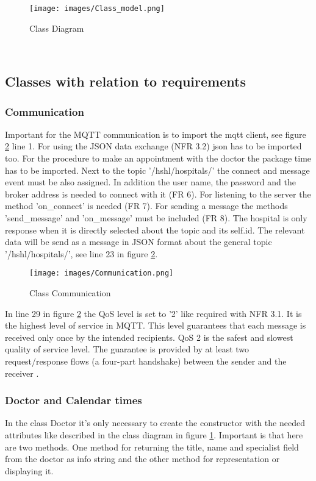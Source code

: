 \begin{figure}[H]
\centering
\sidecaption
\texttt{[image: images/Class\_model.png]}
\caption{Class Diagram}
\label{Class_diagram}
\end{figure}

\\
\subsection{Classes with relation to requirements}
\subsubsection{Communication}
Important for the MQTT communication is to import the mqtt client, see figure \ref{Communication} line 1. For using the JSON data exchange (NFR 3.2) json has to be imported too. For the procedure to make an appointment with the doctor the package time has to be imported. Next to the topic '/hshl/hospitals/' the connect and message event must be also assigned. In addition the user name, the password and the broker address is needed to connect with it (FR 6). For listening to the server the method 'on_connect' is needed (FR 7). For sending a message the methods 'send_message' and 'on_message' must be included (FR 8). The hospital is only response when it is directly selected about the topic and its self.id. The relevant data will be send as a message in JSON format about the general topic '/hshl/hospitals/', see line 23 in figure \ref{Communication}.

\begin{figure}[H]
\centering
\sidecaption
\texttt{[image: images/Communication.png]}
\caption{Class Communication}
\label{Communication}
\end{figure}

In line 29 in figure \ref{Communication} the QoS level is set to '2' like required with NFR 3.1. It is the highest level of service in MQTT. This level guarantees that each message is received only once by the intended recipients. QoS 2 is the safest and slowest quality of service level. The guarantee is provided by at least two request/response flows (a four-part handshake) between the sender and the receiver \cite{ferguson1998quality}.

\subsubsection{Doctor and Calendar times}
In the class Doctor it's only necessary to create the constructor with the needed attributes like described in the class diagram in figure \ref{Class_diagram}. Important is that here are two methods. One method for returning the title, name and specialist field from the doctor as info string and the other method for representation or displaying it. 

